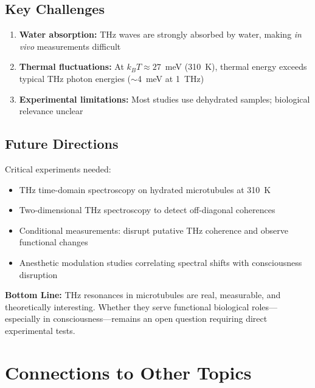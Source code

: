 \subsection{Key Challenges}

\begin{enumerate}
\item \textbf{Water absorption:} THz waves are strongly absorbed by water, making \textit{in vivo} measurements difficult
\item \textbf{Thermal fluctuations:} At $k_B T \approx 27$~meV (310~K), thermal energy exceeds typical THz photon energies ($\sim$4~meV at 1~THz)
\item \textbf{Experimental limitations:} Most studies use dehydrated samples; biological relevance unclear
\end{enumerate}

\subsection{Future Directions}

Critical experiments needed:
\begin{itemize}
\item THz time-domain spectroscopy on hydrated microtubules at 310~K
\item Two-dimensional THz spectroscopy to detect off-diagonal coherences
\item Conditional measurements: disrupt putative THz coherence and observe functional changes
\item Anesthetic modulation studies correlating spectral shifts with consciousness disruption
\end{itemize}

\begin{keyconcept}
\textbf{Bottom Line:} THz resonances in microtubules are real, measurable, and theoretically interesting. Whether they serve functional biological roles---especially in consciousness---remains an open question requiring direct experimental tests.
\end{keyconcept}

\section{Connections to Other Topics}\label{connections-to-other-wiki-pages}

